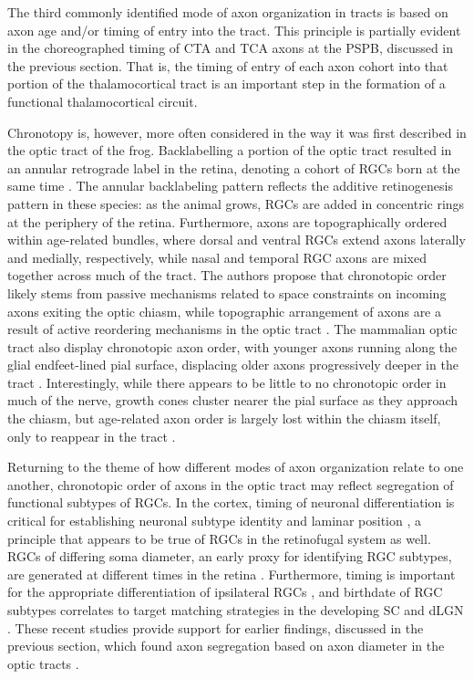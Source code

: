 \label{sec:Chronotopy}
The third commonly identified mode of axon organization in tracts is based on axon age and/or timing of entry into the tract. 
This principle is partially evident in the choreographed timing of CTA and TCA axons at the PSPB, discussed in the previous section.
That is, the timing of entry of each axon cohort into that portion of the thalamocortical tract is an important step in the formation of a functional thalamocortical circuit.

Chronotopy is, however, more often considered in the way it was first described in the optic tract of the frog.
Backlabelling a portion of the optic tract resulted in an annular retrograde label in the retina, denoting a cohort of RGCs born at the same time \cite{reh1983organization,fawcett1984fibre}.
The annular backlabeling pattern reflects the additive retinogenesis pattern in these species: as the animal grows, RGCs are added in concentric rings at the periphery of the retina.
Furthermore, axons are topographically ordered within age-related bundles, where dorsal and ventral RGCs extend axons laterally and medially, respectively, while nasal and temporal RGC axons are mixed together across much of the tract.
The authors propose that chronotopic order likely stems from passive mechanisms related to space constraints on incoming axons exiting the optic chiasm, while topographic arrangement of axons are a result of active reordering mechanisms in the optic tract \cite{reh1983organization}.
The mammalian optic tract also display chronotopic axon order, with younger axons running along the glial endfeet-lined pial surface, displacing older axons progressively deeper in the tract \cite{walsh1985age,reese1987distributionrat,reese1990fibre,colello1992observations,reese1997chronotopic}.
Interestingly, while there appears to be little to no chronotopic order in much of the nerve, growth cones cluster nearer the pial surface as they approach the chiasm, but age-related axon order is largely lost within the chiasm itself, only to reappear in the tract \cite{reese1987distributionrat,colello1992observations,colello1998changing}.

Returning to the theme of how different modes of axon organization relate to one another, chronotopic order of axons in the optic tract may reflect segregation of functional subtypes of RGCs.
In the cortex, timing of neuronal differentiation is critical for establishing neuronal subtype identity and laminar position \cite{molyneaux2007neuronal}, a principle that appears to be true of RGCs in the retinofugal system as well.
RGCs of differing soma diameter, an early proxy for identifying RGC subtypes, are generated at different times in the retina \cite{reese1994birthdates,rapaport1995spatiotemporal}.
Furthermore, timing is important for the appropriate differentiation of ipsilateral RGCs \cite{bhansali2014delayed}, and birthdate of RGC subtypes correlates to target matching strategies in the developing SC and dLGN \cite{osterhout2014birthdate}.
These recent studies provide support for earlier findings, discussed in the previous section, which found axon segregation based on axon diameter in the optic tracts \cite{guillery1982arrangement,torrealba1982studies,reese1987distributionrat,reese1990fibre}.

